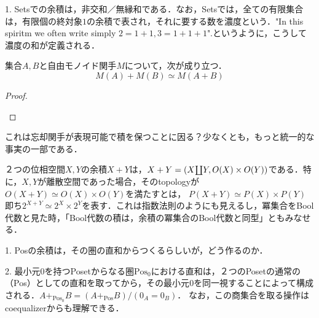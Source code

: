 \documentclass[uplatex, dvipdfmx]{jsarticle}
\begin{document}
\begin{example}
    1. Setsでの余積は，非交和／無縁和である．なお，Setsでは，全ての有限集合は，有限個の終対象$1$の余積で表され，それに要する数を濃度という．"In this spiritm we often write simply $2=1+1,3=1+1+1$".というように，こうして濃度の和が定義される．
\end{example}

\begin{example}[具体圏での直和の構成]
    \begin{proposition*}[自由関手は余積を保つ]
        集合$A,B$と自由モノイド関手$M$について，次が成り立つ．
        \[ M(A)+M(B)\simeq M(A+B) \]
    \end{proposition*}
    \begin{proof}　

        \begin{center}
        \end{center}
    \end{proof}
    \begin{remark*}
        これは忘却関手が表現可能で積を保つことに因る？少なくとも，もっと統一的な事実の一部である．
    \end{remark*}
\end{example}

\begin{example}[Topにて]
    ２つの位相空間$X,Y$の余積$X+Y$は，$X+Y=(X\rotatebox[origin=c]{180}{$\prod$} Y,O(X)\times O(Y))$である．特に，$X,Y$が離散空間であった場合，そのtopologyが$O(X+Y)\simeq O(X)\times O(Y)$を満たすとは，
    $P(X+Y)\simeq P(X)\times P(Y)$即ち$2^{X+Y}\simeq 2^X\times 2^Y$を表す．これは指数法則のようにも見えるし，冪集合をBool代数と見た時，「Bool代数の積は，余積の冪集合のBool代数と同型」ともみなせる．
\end{example}

\begin{example*}[Posにて]
    1. Posの余積は，その圏の直和からつくるらしいが，どう作るのか．

    2. 最小元$0$を持つPosetからなる圏$\mathrm{Pos}_0$における直和は，２つのPosetの通常の（Pos）としての直和を取ってから，その最小元$0$を同一視することによって構成される．$A+_{\mathrm{Pos}_0}B=(A+_{\mathrm{Pos}}B)/(0_A=0_B)$．
    なお，この商集合を取る操作はcoequalizerからも理解できる．
\end{example*}
\end{document}
